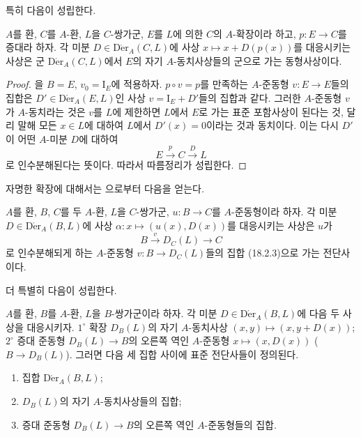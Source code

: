 특히 다음이 성립한다.

\begin{corollary}[20.1.4]
\label{0.20.1.4-ko}
$A$를 환, $C$를 $A$-환, $L$을 $C$-쌍가군, $E$를 $L$에 의한
$C$의 $A$-확장이라 하고, $p:E\to C$를 증대라 하자. 각 미분
$D\in\operatorname{D\acute{e}r}_A(C,L)$에 사상
$x\mapsto x+D(p(x))$를 대응시키는 사상은 군
$\operatorname{D\acute{e}r}_A(C,L)$에서 $E$의 자기 $A$-동치사상들의
군으로 가는 동형사상이다.
\end{corollary}

\begin{proof}
을 $B=E$, $v_0=\mathrm I_E$에 적용하자.
$p\circ v=p$를 만족하는 $A$-준동형 $v:E\to E$들의 집합은
$D'\in\operatorname{D\acute{e}r}_A(E,L)$인 사상
$v=\mathrm I_E+D'$들의 집합과 같다. 그러한 $A$-준동형 $v$가
$A$-동치라는 것은 $v$를 $L$에 제한하면 $L$에서 $E$로 가는 표준
포함사상이 된다는 것, 달리 말해 모든 $x\in L$에 대하여 $L$에서
$D'(x)=0$이라는 것과 동치이다. 이는 다시 $D'$이 어떤 $A$-미분
$D$에 대하여
\[
  E\xrightarrow{p}C\xrightarrow{D}L
\]
로 인수분해된다는 뜻이다. 따라서 따름정리가 성립한다.
\end{proof}

자명한 확장에 대해서는 으로부터 다음을 얻는다.

\begin{corollary}[20.1.5]
\label{0.20.1.5-ko}
$A$를 환, $B$, $C$를 두 $A$-환, $L$을 $C$-쌍가군,
$u:B\to C$를 $A$-준동형이라 하자. 각 미분
$D\in\operatorname{D\acute{e}r}_A(B,L)$에 사상
$\alpha:x\mapsto(u(x),D(x))$를 대응시키는 사상은 $u$가
\[
  B\xrightarrow{v}D_C(L)\longrightarrow C
\]
로 인수분해되게 하는 $A$-준동형 $v:B\to D_C(L)$들의 집합
(18.2.3)으로 가는 전단사이다.
\end{corollary}

더 특별히 다음이 성립한다.

\begin{corollary}[20.1.6]
\label{0.20.1.6-ko}
$A$를 환, $B$를 $A$-환, $L$을 $B$-쌍가군이라 하자. 각 미분
$D\in\operatorname{D\acute{e}r}_A(B,L)$에 다음 두 사상을 대응시키자.
$1^\circ$ 확장 $D_B(L)$의 자기 $A$-동치사상
$(x,y)\mapsto(x,y+D(x))$; $2^\circ$ 증대 준동형
$D_B(L)\to B$의 오른쪽 역인 $A$-준동형
$x\mapsto(x,D(x))$ ($B\to D_B(L)$). 그러면 다음 세 집합 사이에
표준 전단사들이 정의된다.
\begin{enumerate}
  \item[(i)] 집합 $\operatorname{D\acute{e}r}_A(B,L)$;
  \item[(ii)] $D_B(L)$의 자기 $A$-동치사상들의 집합;
  \item[(iii)] 증대 준동형 $D_B(L)\to B$의 오른쪽 역인
  $A$-준동형들의 집합.
\end{enumerate}
\end{corollary}

